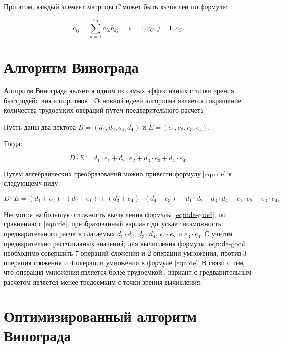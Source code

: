 При этом, каждый элемент матрицы $C$ может быть вычислен по формуле:

\begin{equation} \label{eqn:c-formula}
	c_{ij} = \sum_{k=1}^{r_B} a_{ik}b_{kj},\quad i = \overline{1,r_C},j = \overline{1,c_C}.
\end{equation}

\section{Алгоритм Винограда}

Алгоритм Винограда является одним из самых эффективных с точки зрения быстродействия алгоритмов \cite{bib:8}. Основной идеей алгоритма является сокращение количества трудоемких операций путем предварительного расчета.

Пусть даны два вектора $D = (d_1, d_2, d_3, d_4)$ и $E = (e_1, e_2, e_3, e_4)$. 

Тогда:

\begin{equation} \label{eqn:de}
	D \cdot E = d_1 \cdot e_1 + d_2 \cdot e_2 + d_3 \cdot e_3 + d_4 \cdot e_4.
\end{equation}

Путем алгебраических преобразований можно привести формулу \ref{eqn:de} к следующему виду:

\begin{equation} \label{eqn:de-good}
	D \cdot E = (d_1 + e_2) \cdot (d_2 + e_1) + (d_3 + e_4) \cdot (d_4 + e_3) - d_1 \cdot d_2 - d_3 \cdot d_4 - e_1 \cdot e_2 - e_3 \cdot e_4.
\end{equation}

Несмотря на большую сложность вычисления формулы \ref{eqn:de-good}, по сравнению с \ref{eqn:de}, преобразованный вариант допускает возможность предварительного расчета слагаемых $d_1 \cdot d_2$, $d_3 \cdot d_4$, $e_1 \cdot e_2$ и $e_3 \cdot e_4$. С учетом предварительно рассчитанных значений, для вычисления формулы \ref{eqn:de-good} необходимо совершить 7 операций сложения и 2 операции умножения, против 3 операция сложения и 4 операций умножения в формуле \ref{eqn:de}. В связи с тем, что операция умножения является более трудоемкой \cite{bib:9}, вариант с предварительным расчетом является менее тредоемким с точки зрения вычисления. 

\section{Оптимизированный алгоритм Винограда}


